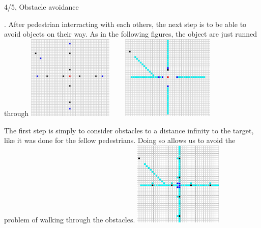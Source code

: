\documentclass[10pt,a4paper]{article}
\begin{document}
\begin{task}{4/5, Obstacle avoidance}

.\newline \newline
After pedestrian interracting with each others, the next step is to be able to avoid objects on their way. \newline
As in the following figures, the object are just runned through \newline \newline
\includegraphics[height=4cm]{Travers_object_init}
~~~
\includegraphics[height=4cm]{Travers_object_inter} \newline \newline

The first step is simply to consider obstacles to a distance infinity to the target, like it was done for the fellow pedestrians. Doing so allows us to avoid the problem of walking through the obstacles. \newline \newline
\includegraphics[height=4cm]{Travers_object_success}\newline \newline


\end{task}
\end{document}
